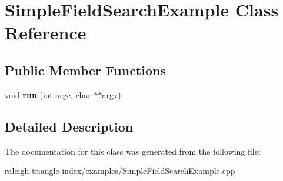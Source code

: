 \section{Simple\+Field\+Search\+Example Class Reference}
\label{class_simple_field_search_example}
\subsection*{Public Member Functions}
\begin{DoxyCompactItemize}
\item 
void {\bfseries run} (int argc, char $\ast$$\ast$argv)\label{class_simple_field_search_example_a60c34c82e1840e463eb8191de5524dba}

\end{DoxyCompactItemize}


\subsection{Detailed Description}


The documentation for this class was generated from the following file\+:\begin{DoxyCompactItemize}
\item 
raleigh-\/triangle-\/index/examples/Simple\+Field\+Search\+Example.\+cpp\end{DoxyCompactItemize}
